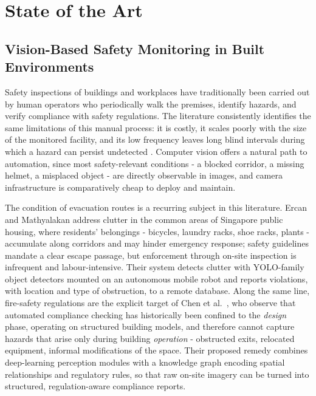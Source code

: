 \chapter{State of the Art}
\label{chap:sota}


\section{Vision-Based Safety Monitoring in Built Environments}
\label{sec:sota-safety}

Safety inspections of buildings and workplaces have traditionally been carried
out by human operators who periodically walk the premises, identify hazards, and
verify compliance with safety regulations. The literature consistently
identifies the same limitations of this manual process: it is costly, it scales
poorly with the size of the monitored facility, and its low frequency leaves
long blind intervals during which a hazard can persist undetected
\cite{Ercan2024,Chen2025}. Computer vision offers a natural path to
automation, since most safety-relevant conditions - a blocked corridor, a
missing helmet, a misplaced object - are directly observable in images, and
camera infrastructure is comparatively cheap to deploy and maintain.

The condition of evacuation routes is a recurring subject in this literature.
Ercan and Mathyalakan \cite{Ercan2024} address clutter in the common areas of
Singapore public housing, where residents' belongings - bicycles, laundry racks,
shoe racks, plants - accumulate along corridors and may hinder emergency
response; safety guidelines mandate a clear escape passage, but enforcement
through on-site inspection is infrequent and labour-intensive. Their system
detects clutter with YOLO-family object detectors mounted on an autonomous
mobile robot and reports violations, with location and type of obstruction, to
a remote database. Along the same line, fire-safety regulations are the
explicit target of Chen et al.~\cite{Chen2025}, who observe that automated
compliance checking has historically been confined to the \emph{design} phase,
operating on structured building models, and therefore cannot capture hazards
that arise only during building \emph{operation} - obstructed exits, relocated
equipment, informal modifications of the space. Their proposed remedy combines
deep-learning perception modules with a knowledge graph encoding spatial
relationships and regulatory rules, so that raw on-site imagery can be turned
into structured, regulation-aware compliance reports.

